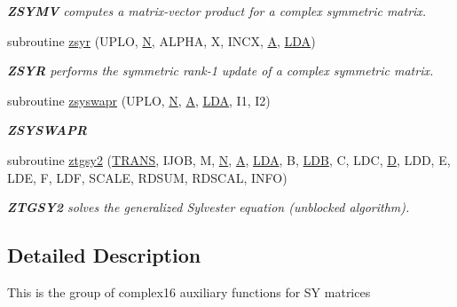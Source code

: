 \begin{DoxyCompactItemize}
\begin{DoxyCompactList}\small\item\em {\bfseries Z\+S\+Y\+M\+V} computes a matrix-\/vector product for a complex symmetric matrix. \end{DoxyCompactList}\item 
subroutine \hyperlink{group__complex16SYauxiliary_ga08a5c1ca17a783b2f7e7f3bc80b422dd}{zsyr} (U\+P\+L\+O, \hyperlink{polmisc_8c_a0240ac851181b84ac374872dc5434ee4}{N}, A\+L\+P\+H\+A, X, I\+N\+C\+X, \hyperlink{classA}{A}, \hyperlink{example__user_8c_ae946da542ce0db94dced19b2ecefd1aa}{L\+D\+A})
\begin{DoxyCompactList}\small\item\em {\bfseries Z\+S\+Y\+R} performs the symmetric rank-\/1 update of a complex symmetric matrix. \end{DoxyCompactList}\item 
subroutine \hyperlink{group__complex16SYauxiliary_ga36d9ec6db6e6dda43c30a8727ae0d6ae}{zsyswapr} (U\+P\+L\+O, \hyperlink{polmisc_8c_a0240ac851181b84ac374872dc5434ee4}{N}, \hyperlink{classA}{A}, \hyperlink{example__user_8c_ae946da542ce0db94dced19b2ecefd1aa}{L\+D\+A}, I1, I2)
\begin{DoxyCompactList}\small\item\em {\bfseries Z\+S\+Y\+S\+W\+A\+P\+R} \end{DoxyCompactList}\item 
subroutine \hyperlink{group__complex16SYauxiliary_gab24c8af7cc49b5eef89718d4d6a889e3}{ztgsy2} (\hyperlink{superlu__enum__consts_8h_a0c4e17b2d5cea33f9991ccc6a6678d62a1f61e3015bfe0f0c2c3fda4c5a0cdf58}{T\+R\+A\+N\+S}, I\+J\+O\+B, M, \hyperlink{polmisc_8c_a0240ac851181b84ac374872dc5434ee4}{N}, \hyperlink{classA}{A}, \hyperlink{example__user_8c_ae946da542ce0db94dced19b2ecefd1aa}{L\+D\+A}, B, \hyperlink{example__user_8c_a50e90a7104df172b5a89a06c47fcca04}{L\+D\+B}, C, L\+D\+C, \hyperlink{odrpack_8h_a7dae6ea403d00f3687f24a874e67d139}{D}, L\+D\+D, E, L\+D\+E, F, L\+D\+F, S\+C\+A\+L\+E, R\+D\+S\+U\+M, R\+D\+S\+C\+A\+L, I\+N\+F\+O)
\begin{DoxyCompactList}\small\item\em {\bfseries Z\+T\+G\+S\+Y2} solves the generalized Sylvester equation (unblocked algorithm). \end{DoxyCompactList}\end{DoxyCompactItemize}


\subsection{Detailed Description}
This is the group of complex16 auxiliary functions for S\+Y matrices 

